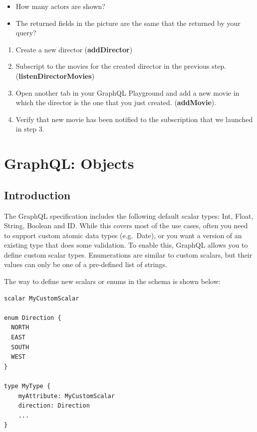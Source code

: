 \documentclass[]{book}
\providecommand{\tightlist}{%
  \setlength{\itemsep}{0pt}\setlength{\parskip}{0pt}}
\begin{document}
\begin{itemize}
\item
  How many actors are shown?
\item
  The returned fields in the picture are the same that the returned by
  your query?
\end{itemize}

\begin{enumerate}
\def\labelenumi{\arabic{enumi}.}
\setcounter{enumi}{1}
\tightlist
\item
  Create a new director (\textbf{addDirector})
\item
  Subscript to the movies for the created director in the previous step.
  (\textbf{listenDirectorMovies})
\item
  Open another tab in your GraphQL Playground and add a new movie in
  which the director is the one that you just created.
  (\textbf{addMovie}).
\item
  Verify that new movie has been notified to the subscription that we
  launched in step 3.
\end{enumerate}

\chapter{GraphQL: Objects}\label{graphql-objects}

\section{Introduction}\label{introduction-1}

The GraphQL specification includes the following default scalar types:
Int, Float, String, Boolean and ID. While this covers most of the use
cases, often you need to support custom atomic data types (e.g.~Date),
or you want a version of an existing type that does some validation. To
enable this, GraphQL allows you to define custom scalar types.
Enumerations are similar to custom scalars, but their values can only be
one of a pre-defined list of strings.

The way to define new scalars or enums in the schema is shown below:

\begin{verbatim}
scalar MyCustomScalar

enum Direction {
  NORTH
  EAST
  SOUTH
  WEST
}

type MyType {
    myAttribute: MyCustomScalar
    direction: Direction
    ...
}
\end{verbatim}
\end{document}
